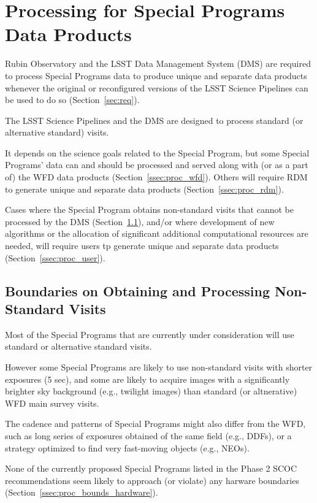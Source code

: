 \section{Processing for Special Programs Data Products}\label{sec:proc}

Rubin Observatory and the LSST Data Management System (DMS) are required 
to process Special Programs data to produce unique and separate data 
products whenever the original or reconfigured versions of the LSST 
Science Pipelines can be used to do so (Section~\ref{sec:req}).

The LSST Science Pipelines and the DMS are designed to process standard 
(or alternative standard) visits.

It depends on the science goals related to the Special Program, but some 
Special Programs' data can and should be processed and served along with 
(or as a part of) the WFD data products (Section~\ref{ssec:proc_wfd}).
Others will require RDM to generate unique and separate data products 
(Section~\ref{ssec:proc_rdm}). 

Cases where the Special Program obtains non-standard visits that cannot 
be processed by the DMS (Section~\ref{ssec:proc_bounds}), and/or where 
development of new algorithms or the allocation of significant additional 
computational resources are needed, will require users tp generate unique
and separate data products (Section~\ref{ssec:proc_user}).


\subsection{Boundaries on Obtaining and Processing Non-Standard Visits} \label{ssec:proc_bounds}

Most of the Special Programs that are currently under consideration will 
use standard or alternative standard visits.

However some Special Programs are likely to use non-standard visits with 
shorter exposures (5 sec), and some are likely to acquire images with a 
significantly brighter sky background (e.g., twilight images) than 
standard (or altnerative) WFD main survey visits.

The cadence and patterns of Special Programs might also differ from the 
WFD, such as long series of exposures obtained of the same field 
(e.g., DDFs), or a strategy optimized to find very fast-moving objects 
(e.g., NEOs).

None of the currently proposed Special Programs listed in the Phase 2 
SCOC recommendations  
seem likely to approach (or violate) any harware boundaries 
(Section~\ref{ssec:proc_bounds_hardware}).

